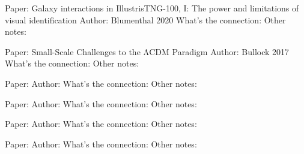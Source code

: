     Paper: Galaxy interactions in IllustrisTNG-100, I: The power and limitations of visual identification
    Author: Blumenthal 2020
    What's the connection:
    Other notes:
    
    Paper: Small-Scale Challenges to the ΛCDM Paradigm
    Author: Bullock 2017
    What's the connection:
    Other notes:
    
    Paper:
    Author:
    What's the connection:
    Other notes:
    
    Paper:
    Author:
    What's the connection:
    Other notes:
    
    Paper:
    Author:
    What's the connection:
    Other notes:
    
    Paper:
    Author:
    What's the connection:
    Other notes: